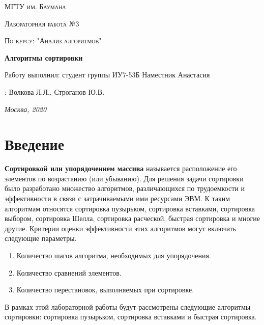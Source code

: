 \documentclass[12pt]{report}
\begin{document}
 
\begin{titlepage}
	\centering
	{\scshape\LARGE МГТУ им. Баумана \par}
	\vspace{3cm}
	{\scshape\Large Лабораторная работа №3\par}
	\vspace{0.5cm}	
	{\scshape\Large По курсу: "Анализ алгоритмов"\par}
	\vspace{1.5cm}
	{\huge\bfseries Алгоритмы сортировки\par}
	\vspace{2cm}
	\Large Работу выполнил: студент группы ИУ7-53Б Наместник Анастасия\par
	\vspace{0.5cm}
	:  Волкова Л.Л., Строганов Ю.В.\par

	\vfill
	\large \textit {Москва, 2020} \par
\end{titlepage}

\tableofcontents

\newpage
\chapter*{Введение}

\textbf{            		Сортировкой или упорядочением массива} называется расположение его элементов по возрастанию (или убыванию).  Для решения задачи сортировки было разработано множество алгоритмов, различающихся по трудоемкости и эффективности в связи с затрачиваемыми ими ресурсами ЭВМ. К таким алгоритмам относятся сортировка пузырьком, сортировка вставками, сортировка выбором, сортировка Шелла, сортировка расческой, быстрая сортировка и многие другие. Критерии оценки эффективности этих алгоритмов могут включать следующие параметры.
\begin{enumerate}
\item Количество шагов алгоритма, необходимых для упорядочения.
\item Количество сравнений элементов.
\item Количество перестановок, выполняемых при сортировке.
\end{enumerate}

 В рамках этой лабораторной работы будут рассмотрены следующие алгоритмы сортировки: сортировка пузырьком,  сортировка вставками и быстрая сортировка.
\end{document}
